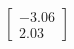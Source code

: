 \documentclass[preview]{standalone}
\begin{document}
\begin{align*}
\begin{bmatrix} -3.06 \\ 2.03 \end{bmatrix}
\end{align*}
\end{document}
